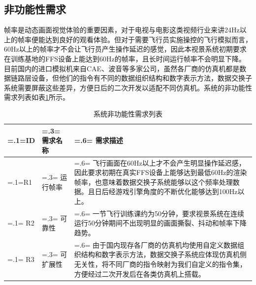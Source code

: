 \subsection{非功能性需求}
帧率是动态画面视觉体验的重要因素，对于电视与电影这类视频行业来讲24Hz以上的帧率便能达到良好的观看体验\cite{frame}。但对于需要飞行员实施操控的飞行模拟而言，60Hz以上的帧率才不会让飞行员产生操作延迟的感觉，因此本视景系统初期要求在训练基地的FFS设备上能达到60Hz的帧率，且长时间运行帧率不会明显下降。
目前国内的进口模拟机来自CAE、波音等多家公司，虽然各厂商的仿真机都是数据链路层设备，但他们的指令有不同的数据组织结构和数字表示方法，数据交换子系统需要屏蔽这些差异，方便日后的二次开发以适配不同仿真机。系统的非功能性需求列表如表\ref{unfuncreq}所示。
\begin{table}[h!]
    \begin{center}
        \caption{系统非功能性需求列表}
        \label{unfuncreq}
        \renewcommand\arraystretch{1.5}
        \begin{tabularx}{0.8\textwidth}{ 
            | >{\centering\arraybackslash\hsize=.1\hsize\linewidth=\hsize}X 
            | >{\centering\arraybackslash\hsize=.3\hsize\linewidth=\hsize}X 
            | >{\raggedright\arraybackslash\hsize=.6\hsize\linewidth=\hsize}X 
            | }
            \hline
            \textbf{ID} & \textbf{需求名称} & \textbf{需求描述}\\
            \hline
            R1 & 运行帧率 & 飞行画面在60Hz以上才不会产生明显操作延迟感，因此要求初期在真实FFS设备上能够达到最低60Hz的渲染帧率，也意味着数据交换子系统能够以这个频率处理数据。且日后经游戏引擎角度的不断优化能够达到100Hz以上。\\
            \hline
            R2 & 可靠性 & 一节飞行训练课约为50分钟，要求视景系统在连续运行50分钟期间不出现明显的画面撕裂、抖动和帧率下降趋势。\\
            \hline
            R3 & 可扩展性 & 由于国内现存各厂商的仿真机均使用自定义数据组织结构和数字表示方法，数据交换子系统应体现仿真机侧无关性，将不同厂商的指令映射为我们自定义的指令集，方便经过二次开发后在各类仿真机上搭载。\\
            \hline
        \end{tabularx}
    \end{center}
\end{table}

